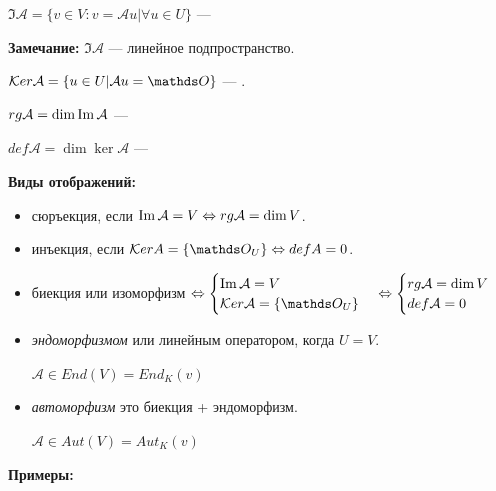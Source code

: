  $\Im \mathcal{A} = \{v \in V:v =\mathcal{A} u| \forall u\in U \}$ --- 

\textbf{Замечание:} $\Im \mathcal{A}$ --- линейное подпространство.

$\ker  \mathcal{A} = \{u \in U| \mathcal{A} u = \zero\}$ %
--- .

 $rg \mathcal{A} = \dim \operatorname{Im} \mathcal{A}$ --- 

 $def \mathcal{A} = \dim \ker \mathcal{A}$ --- 

\newpage

\textbf{Виды отображений:}

\begin{itemize}
    \item сюръекция, если $\operatorname{Im} \mathcal{A} = V \Leftrightarrow rg \mathcal{A}= \dim V$.
    \item инъекция, если $\ker A = \{\zero_U\} \Leftrightarrow def A = 0$.

    \item биекция или изоморфизм $\Leftrightarrow \begin{cases}
        \Im \mathcal{A} = V\\
        \ker \mathcal{A} = \{\zero_U\}
    \end{cases} \Leftrightarrow \begin{cases}
        \rg \mathcal{A} = \dim V \\
        def \mathcal{A} = 0
    \end{cases}$
    \item \emph{эндоморфизмом} или линейным оператором, когда $U = V$.

    $\mathcal{A} \in End(V) = End_K(v)$ %
    \item \emph{автоморфизм} это биекция + эндоморфизм.

     $\mathcal{A} \in Aut(V) = Aut_K(v)$ %
\end{itemize}

\textbf{Примеры:}


